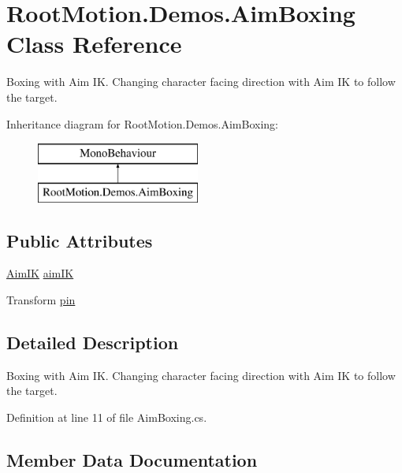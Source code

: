 \hypertarget{class_root_motion_1_1_demos_1_1_aim_boxing}{}\section{Root\+Motion.\+Demos.\+Aim\+Boxing Class Reference}
\label{class_root_motion_1_1_demos_1_1_aim_boxing}


Boxing with Aim IK. Changing character facing direction with Aim IK to follow the target.  


Inheritance diagram for Root\+Motion.\+Demos.\+Aim\+Boxing\+:\begin{figure}[H]
\begin{center}
\leavevmode
\includegraphics[height=2.000000cm]{class_root_motion_1_1_demos_1_1_aim_boxing}
\end{center}
\end{figure}
\subsection*{Public Attributes}
\begin{DoxyCompactItemize}
\item 
\mbox{\hyperlink{class_root_motion_1_1_final_i_k_1_1_aim_i_k}{Aim\+IK}} \mbox{\hyperlink{class_root_motion_1_1_demos_1_1_aim_boxing_a680d20af0ff6661e15becbdcf7269a06}{aim\+IK}}
\item 
Transform \mbox{\hyperlink{class_root_motion_1_1_demos_1_1_aim_boxing_ad0580f75bac338543501c2efa2c039c3}{pin}}
\end{DoxyCompactItemize}


\subsection{Detailed Description}
Boxing with Aim IK. Changing character facing direction with Aim IK to follow the target. 



Definition at line 11 of file Aim\+Boxing.\+cs.



\subsection{Member Data Documentation}
\mbox{\label{class_root_motion_1_1_demos_1_1_aim_boxing_a680d20af0ff6661e15becbdcf7269a06}} 
